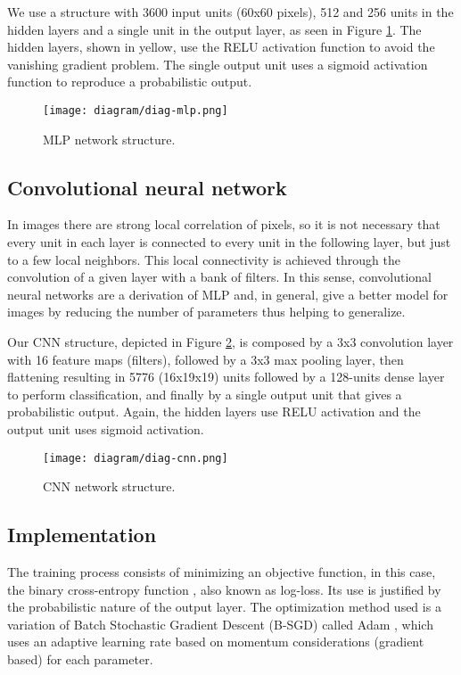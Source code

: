         We use a structure with 3600 input units (60x60 pixels), 512 and 256 units in the hidden layers and a single unit in the output layer, as seen in Figure \ref{fig:diag-mlp}. The hidden layers, shown in yellow, use the RELU \cite{nair2010relu} activation function to avoid the vanishing gradient problem. The single output unit uses a sigmoid activation function to reproduce a probabilistic output.

        \begin{figure}
        \centering
        \texttt{[image: diagram/diag-mlp.png]}
        \caption{MLP network structure.}
        \label{fig:diag-mlp}
        \end{figure}

    \subsection{Convolutional neural network}
         In images there are strong local correlation of pixels, so it is not necessary that every unit in each layer is connected to every unit in the following layer, but just to a few local neighbors. This local connectivity is achieved through the convolution of a given layer with a bank of filters. In this sense, convolutional neural networks are a derivation of MLP and, in general, give a better model for images by reducing the number of parameters thus helping to generalize.

        Our CNN structure, depicted in Figure \ref{fig:diag-cnn}, is composed by a 3x3 convolution layer with 16 feature maps (filters), followed by a 3x3 max pooling layer, then flattening resulting in 5776 (16x19x19) units followed by a 128-units dense layer to perform classification, and finally by a single output unit that gives a probabilistic output. Again, the hidden layers use RELU activation and the output unit uses sigmoid activation.

        \begin{figure}
        \centering
        \texttt{[image: diagram/diag-cnn.png]}
        \caption{CNN network structure.}
        \label{fig:diag-cnn}
        \end{figure}

    \subsection{Implementation}
        The training process consists of minimizing an objective function, in this case, the binary cross-entropy function \cite{DLbook}, also known as log-loss. Its use is justified by the probabilistic nature of the output layer. The optimization method used is a variation of Batch Stochastic Gradient Descent (B-SGD) called Adam \cite{kingma2014adam}, which uses an adaptive learning rate based on momentum considerations (gradient based) for each parameter.

